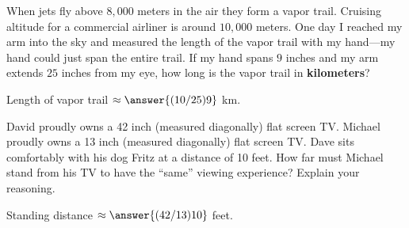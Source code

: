 \documentclass[nooutcomes]{ximera}
\begin{document}
\begin{question}
When jets fly above $8,000$ meters in the air they form a vapor
  trail. Cruising altitude for a commercial airliner is around $10,000$
  meters. One day I reached my arm into the sky and measured the
  length of the vapor trail with my hand---my hand could just span the
  entire trail. If my hand spans $9$ inches and my arm extends $25$
  inches from my eye, how long is the vapor trail in \textbf{kilometers}? 

Length of vapor trail $\approx \answer{(10/25)9}$ km. 
\end{question}

\begin{question}
David proudly owns a 42 inch (measured diagonally) flat screen
  TV. Michael proudly owns a 13 inch (measured diagonally) flat screen
  TV. Dave sits comfortably with his dog Fritz at a distance of 10
  feet. How far must Michael stand from his TV to have the ``same''
  viewing experience?  Explain your reasoning.

Standing distance $\approx \answer{(42/13)10}$ feet.  
\end{question}

\end{document}
